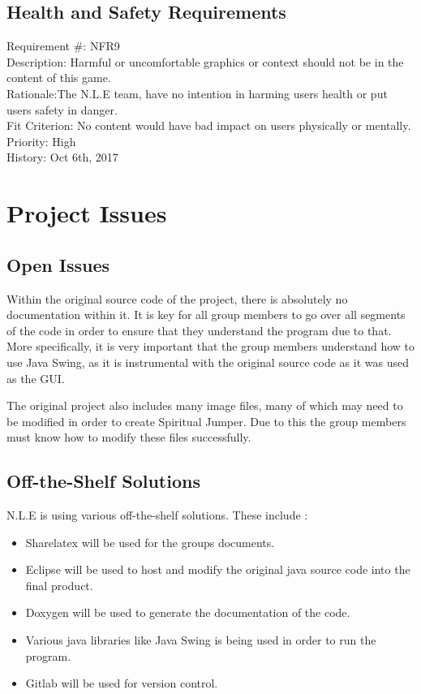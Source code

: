 \documentclass[12pt, titlepage]{article}
\begin{document}
\subsection{Health and Safety Requirements}
Requirement \#: NFR9\\
Description: Harmful or uncomfortable graphics or context should not be in the content of this game.\\
Rationale:The N.L.E team, have no intention in harming users health or put users safety in danger.\\
Fit Criterion: No content would have bad impact on users physically or mentally.\\
Priority: High\\
History: Oct 6th, 2017\\


\section{Project Issues}

\subsection{Open Issues}

Within the original source code of the project, there is absolutely no documentation within it. It is key for all group members to go over all segments of the code in order to ensure that they understand the program due to that. More specifically, it is very important that the group members understand how to use Java Swing, as it is instrumental with the original source code as it was used as the GUI. 

The original project also includes many image files, many of which may need to be modified in order to create Spiritual Jumper. Due to this the group members must know how to modify these files successfully.

\subsection{Off-the-Shelf Solutions}

N.L.E is using various off-the-shelf solutions. These include : 

\begin{itemize}
  \item Sharelatex will be used for the groups documents.
  \item Eclipse will be used to host and modify the original java source code into the final product.
  \item Doxygen will be used to generate the documentation of the code.
  \item Various java libraries like Java Swing is being used in order to run the program.
  \item Gitlab will be used for version control.
\end{itemize}
\end{document}
